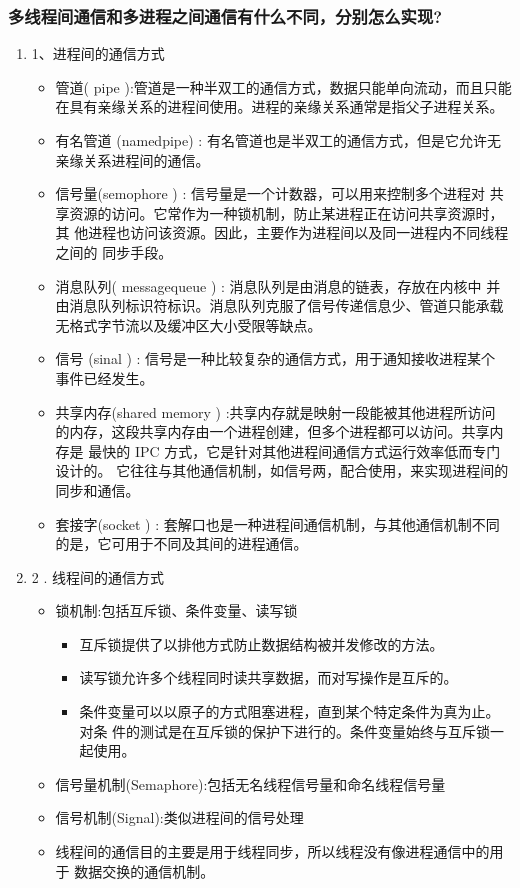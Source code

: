 \documentclass[9pt, b5paper]{article}
\begin{document}
\subsubsection{多线程间通信和多进程之间通信有什么不同，分别怎么实现?}
\label{sec-3-2-4}
\begin{enumerate}
\item 1、进程间的通信方式
\label{sec-3-2-4-1}
\begin{itemize}
\item 管道( pipe ):管道是一种半双工的通信方式，数据只能单向流动，而且只能在具有亲缘关系的进程间使用。进程的亲缘关系通常是指父子进程关系。
\item 有名管道 (namedpipe) : 有名管道也是半双工的通信方式，但是它允许无亲缘关系进程间的通信。
\item 信号量(semophore ) : 信号量是一个计数器，可以用来控制多个进程对 共享资源的访问。它常作为一种锁机制，防止某进程正在访问共享资源时，其 他进程也访问该资源。因此，主要作为进程间以及同一进程内不同线程之间的 同步手段。
\item 消息队列( messagequeue ) : 消息队列是由消息的链表，存放在内核中 并由消息队列标识符标识。消息队列克服了信号传递信息少、管道只能承载无格式字节流以及缓冲区大小受限等缺点。
\item 信号 (sinal ) : 信号是一种比较复杂的通信方式，用于通知接收进程某个 事件已经发生。
\item 共享内存(shared memory ) :共享内存就是映射一段能被其他进程所访问 的内存，这段共享内存由一个进程创建，但多个进程都可以访问。共享内存是 最快的 IPC 方式，它是针对其他进程间通信方式运行效率低而专门设计的。 它往往与其他通信机制，如信号两，配合使用，来实现进程间的同步和通信。
\item 套接字(socket ) : 套解口也是一种进程间通信机制，与其他通信机制不同 的是，它可用于不同及其间的进程通信。
\end{itemize}
\item 2 . 线程间的通信方式
\label{sec-3-2-4-2}
\begin{itemize}
\item 锁机制:包括互斥锁、条件变量、读写锁
\begin{itemize}
\item 互斥锁提供了以排他方式防止数据结构被并发修改的方法。
\item 读写锁允许多个线程同时读共享数据，而对写操作是互斥的。
\item 条件变量可以以原子的方式阻塞进程，直到某个特定条件为真为止。对条 件的测试是在互斥锁的保护下进行的。条件变量始终与互斥锁一起使用。
\end{itemize}
\item 信号量机制(Semaphore):包括无名线程信号量和命名线程信号量
\item 信号机制(Signal):类似进程间的信号处理
\item 线程间的通信目的主要是用于线程同步，所以线程没有像进程通信中的用于 数据交换的通信机制。
\end{itemize}
\end{enumerate}
\end{document}
